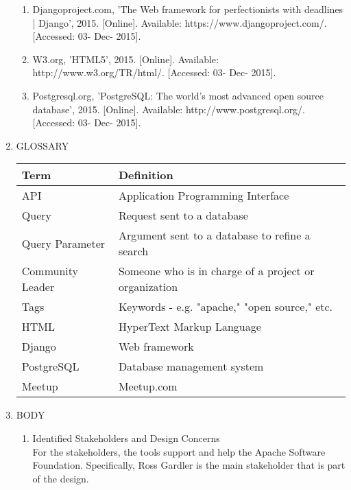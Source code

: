 \documentclass[draftclsnofoot,10pt,onecolumn]{IEEEtran} %
\begin{document}
\begin{enumerate}
\begin{enumerate}
		\item Djangoproject.com, 'The Web framework for perfectionists with deadlines | Django', 2015. [Online]. Available:
		https://www.djangoproject.com/. [Accessed: 03- Dec- 2015]. \\
		
		\item W3.org, 'HTML5', 2015. [Online]. Available: http://www.w3.org/TR/html/. [Accessed: 03- Dec- 2015]. \\
		
		\item Postgresql.org, 'PostgreSQL: The world's most advanced open source database', 2015. [Online]. Available:
		http://www.postgresql.org/. [Accessed: 03- Dec- 2015]. \\
		
	\end{enumerate}

\item GLOSSARY

\begin{longtable}[1]{ | C{7cm} | C{7cm} |} 
\hline
Term & Definition \\ 
\hline
API & Application Programming Interface\\
\hline
Query & Request sent to a database
\\
\hline
Query Parameter & Argument sent to a database to refine a search
\\
\hline
Community Leader & Someone who is in charge of a project or organization
\\
\hline
Tags &  Keywords - e.g. "apache," "open source," etc.
\\
\hline
HTML & HyperText Markup Language
\\
\hline
Django & Web framework
\\
\hline
PostgreSQL & Database management system
\\
\hline
Meetup & Meetup.com
\\
\hline
\end{longtable}

\item BODY \\
	\begin{enumerate}
		\item Identified Stakeholders and Design Concerns \\
		For the stakeholders, the tools support and help the Apache Software Foundation. Specifically, Ross Gardler is the
		main stakeholder that is part of the design.\\
		

\end{enumerate}
\end{enumerate}
\end{document}
